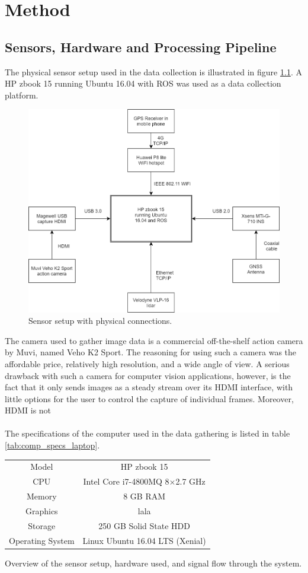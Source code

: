 
\chapter{Method}
\section{Sensors, Hardware and Processing Pipeline}
The physical sensor setup used in the data collection is illustrated in figure \ref{fig:sensor_setup}. A HP zbook 15 running Ubuntu 16.04 with ROS was used as a data collection platform.
\begin{figure}[H]
    \centering
    \includegraphics[width=.8\linewidth]{fig/sensor_setup.png}
    \caption{Sensor setup with physical connections.}
    \label{fig:sensor_setup}
\end{figure}
The camera used to gather image data is a commercial off-the-shelf action camera by Muvi, named Veho K2 Sport. The reasoning for using such a camera was the affordable price, relatively high resolution, and a wide angle of view. A serious drawback with such a camera for computer vision applications, however, is the fact that it only sends images as a steady stream over its HDMI interface, with little options for the user to control the capture of individual frames. Moreover, HDMI is not  \\
\vspace{2mm}\\
\noindent The specifications of the computer used in the data gathering is listed in table \ref{tab:comp_specs_laptop}.
\begin{tabular}[H]{|c|c|}
\label{tab:comp_specs_laptop}
\centering
\hline
Model & HP zbook 15\\
CPU & Intel Core i7-4800MQ 8$\times$2.7 GHz \\
Memory & 8 GB RAM \\
Graphics & lala \\
Storage & 250 GB Solid State HDD \\
Operating System & Linux Ubuntu 16.04 LTS (Xenial)\\
\hline
\end{tabular}
Overview of the sensor setup, hardware used, and signal flow through the system.
